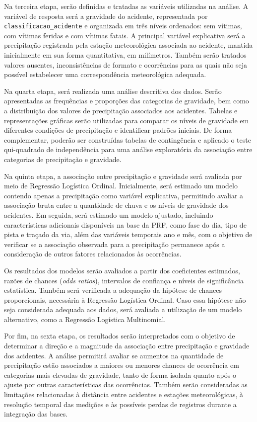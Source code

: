 \documentclass[12pt]{article}
\begin{document}
Na terceira etapa, serão definidas e tratadas as variáveis utilizadas na análise. A variável de resposta será a gravidade do acidente, representada por \verb|classificacao_acidente| e organizada em três níveis ordenados: sem vítimas, com vítimas feridas e com vítimas fatais. A principal variável explicativa será a precipitação registrada pela estação meteorológica associada ao acidente, mantida inicialmente em sua forma quantitativa, em milímetros. Também serão tratados valores ausentes, inconsistências de formato e ocorrências para as quais não seja possível estabelecer uma correspondência meteorológica adequada.

Na quarta etapa, será realizada uma análise descritiva dos dados. Serão apresentadas as frequências e proporções das categorias de gravidade, bem como a distribuição dos valores de precipitação associados aos acidentes. Tabelas e representações gráficas serão utilizadas para comparar os níveis de gravidade em diferentes condições de precipitação e identificar padrões iniciais. De forma complementar, poderão ser construídas tabelas de contingência e aplicado o teste qui-quadrado de independência para uma análise exploratória da associação entre categorias de precipitação e gravidade.

Na quinta etapa, a associação entre precipitação e gravidade será avaliada por meio de Regressão Logística Ordinal. Inicialmente, será estimado um modelo contendo apenas a precipitação como variável explicativa, permitindo avaliar a associação bruta entre a quantidade de chuva e os níveis de gravidade dos acidentes. Em seguida, será estimado um modelo ajustado, incluindo características adicionais disponíveis na base da PRF, como fase do dia, tipo de pista e traçado da via, além das variáveis temporais ano e mês, com o objetivo de verificar se a associação observada para a precipitação permanece após a consideração de outros fatores relacionados às ocorrências.

Os resultados dos modelos serão avaliados a partir dos coeficientes estimados, razões de chances (\textit{odds ratios}), intervalos de confiança e níveis de significância estatística. Também será verificada a adequação da hipótese de chances proporcionais, necessária à Regressão Logística Ordinal. Caso essa hipótese não seja considerada adequada aos dados, será avaliada a utilização de um modelo alternativo, como a Regressão Logística Multinomial.

Por fim, na sexta etapa, os resultados serão interpretados com o objetivo de determinar a direção e a magnitude da associação entre precipitação e gravidade dos acidentes. A análise permitirá avaliar se aumentos na quantidade de precipitação estão associados a maiores ou menores chances de ocorrência em categorias mais elevadas de gravidade, tanto de forma isolada quanto após o ajuste por outras características das ocorrências. Também serão consideradas as limitações relacionadas à distância entre acidentes e estações meteorológicas, à resolução temporal das medições e às possíveis perdas de registros durante a integração das bases.
\end{document}
